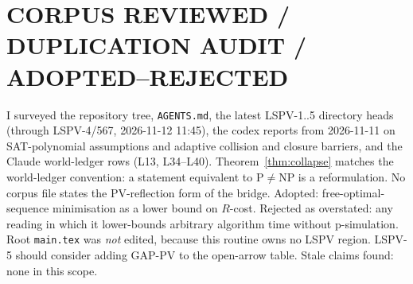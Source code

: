 \documentclass[11pt]{article}
\begin{document}
\section*{CORPUS REVIEWED / DUPLICATION AUDIT / ADOPTED--REJECTED}
I surveyed the repository tree, \texttt{AGENTS.md}, the latest LSPV-1..5 directory heads
(through LSPV-4/567, 2026-11-12 11:45), the codex reports from 2026-11-11 on SAT-polynomial
assumptions and adaptive collision and closure barriers, and the Claude world-ledger rows
(L13, L34--L40). Theorem~\ref{thm:collapse} matches the world-ledger convention: a statement
equivalent to P$\neq$NP is a reformulation. No corpus file states the PV-reflection form of
the bridge. Adopted: free-optimal-sequence minimisation as a lower bound on $R$-cost.
Rejected as overstated: any reading in which it lower-bounds arbitrary algorithm time
without p-simulation. Root \texttt{main.tex} was \emph{not} edited, because this routine owns
no LSPV region. LSPV-5 should consider adding GAP-PV to the open-arrow table. Stale claims
found: none in this scope.
\end{document}
